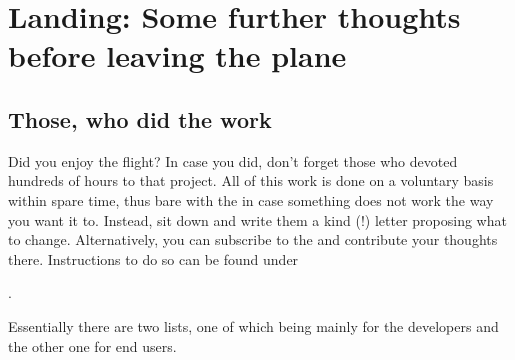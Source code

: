 
\chapter{Landing: Some further thoughts before leaving the plane\label{landing}}


\section{Those, who did the work}

Did you enjoy the flight? In case you did, don't forget those who devoted hundreds of
hours to that project. All of this work is done on a voluntary basis within spare time,
thus bare with the  in case something does not work the way you want
it to. Instead, sit down and write them a kind (!) letter proposing what to change.
Alternatively, you can subscribe to the \FlightGear {} and contribute
your thoughts there. Instructions to do so can be found under

 .

Essentially there are two lists, one of which being mainly for the developers and the
other one for end users.
\medskip

